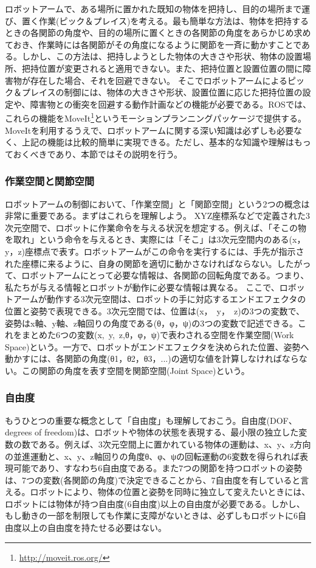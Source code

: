 ロボットアームで、ある場所に置かれた既知の物体を把持し、目的の場所まで運び、置く作業(ピック＆プレイス)を考える。最も簡単な方法は、物体を把持するときの各関節の角度や、目的の場所に置くときの各関節の角度をあらかじめ求めておき、作業時には各関節がその角度になるように関節を一斉に動かすことである。しかし、この方法は、把持しようとした物体の大きさや形状、物体の設置場所、把持位置が変更されると適用できない。また、把持位置と設置位置の間に障害物が存在した場合、それを回避できない。
そこでロボットアームによるピック＆プレイスの制御には、物体の大きさや形状、設置位置に応じた把持位置の設定や、障害物との衝突を回避する動作計画などの機能が必要である。ROSでは、これらの機能をMoveIt\footnote{\url{http://moveit.ros.org/}}というモーションプランニングパッケージで提供する。MoveItを利用するうえで、ロボットアームに関する深い知識は必ずしも必要なく、上記の機能は比較的簡単に実現できる。ただし、基本的な知識や理解はもっておくべきであり、本節ではその説明を行う。

\subsubsection{作業空間と関節空間}

ロボットアームの制御において、「作業空間」と「関節空間」という2つの概念は非常に重要である。まずはこれらを理解しよう。
XYZ座標系などで定義された3次元空間で、ロボットに作業命令を与える状況を想定する。例えば、「そこの物を取れ」という命令を与えるとき、実際には「そこ」は3次元空間内のある(x，y，z)座標点で表す。ロボットアームがこの命令を実行するには、手先が指示された座標に来るように、自身の関節を適切に動かさなければならない。したがって、ロボットアームにとって必要な情報は、各関節の回転角度である。つまり、私たちが与える情報とロボットが動作に必要な情報は異なる。
ここで、ロボットアームが動作する3次元空間は、ロボットの手に対応するエンドエフェクタの位置と姿勢で表現できる。3次元空間では、位置は(x，\ y，\ z)の3つの変数で、姿勢はx軸、y軸、z軸回りの角度である(θ，φ，ψ)の3つの変数で記述できる。これをまとめた6つの変数(x,\ y,\ z,θ，φ，ψ)で表わされる空間を作業空間(Work Space)という。一方で、ロボットがエンドエフェクタを決められた位置、姿勢へ動かすには、各関節の角度(θ1，θ2，θ3，...)の適切な値を計算しなければならない。この関節の角度を表す空間を関節空間(Joint Space)という。

\subsubsection{自由度}

もうひとつの重要な概念として「自由度」も理解しておこう。自由度(DOF、degrees of freedom)は、ロボットや物体の状態を表現する、最小限の独立した変数の数である。例えば、3次元空間上に置かれている物体の運動は、x、y、z方向の並進運動と、x、y、z軸回りの角度θ、φ、ψの回転運動の6変数を得られれば表現可能であり、すなわち6自由度である。また7つの関節を持つロボットの姿勢は、7つの変数(各関節の角度)で決定できることから、7自由度を有していると言える。ロボットにより、物体の位置と姿勢を同時に独立して変えたいときには、ロボットには物体が持つ自由度(6自由度)以上の自由度が必要である。しかし、もし動きの一部を制限しても作業に支障がないときは、必ずしもロボットに6自由度以上の自由度を持たせる必要はない。

